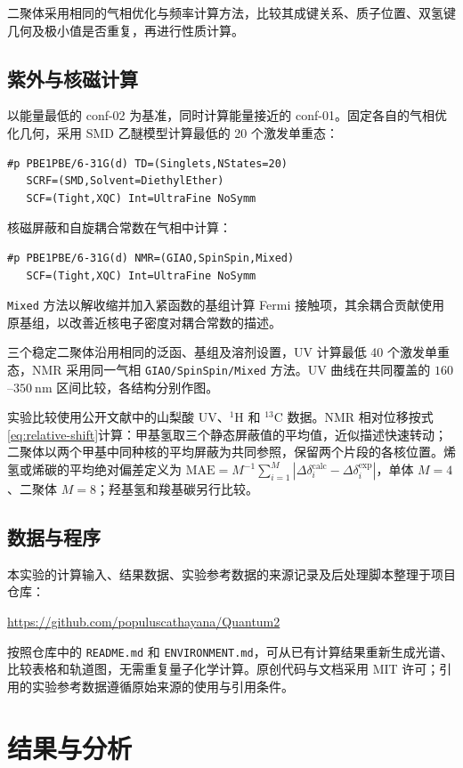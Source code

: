 \documentclass[a4paper,12pt]{article}
\begin{document}
二聚体采用相同的气相优化与频率计算方法，比较其成键关系、质子位置、双氢键几何及极小值是否重复，再进行性质计算。

\subsection{紫外与核磁计算}
以能量最低的 conf-02 为基准，同时计算能量接近的 conf-01。固定各自的气相优化几何，采用 SMD 乙醚模型计算最低的 20 个激发单重态：
\begin{lstlisting}
#p PBE1PBE/6-31G(d) TD=(Singlets,NStates=20)
   SCRF=(SMD,Solvent=DiethylEther)
   SCF=(Tight,XQC) Int=UltraFine NoSymm
\end{lstlisting}
核磁屏蔽和自旋耦合常数在气相中计算：
\begin{lstlisting}
#p PBE1PBE/6-31G(d) NMR=(GIAO,SpinSpin,Mixed)
   SCF=(Tight,XQC) Int=UltraFine NoSymm
\end{lstlisting}
\texttt{Mixed} 方法以解收缩并加入紧函数的基组计算 Fermi 接触项，其余耦合贡献使用原基组，以改善近核电子密度对耦合常数的描述\cite{nmr,deng}。

三个稳定二聚体沿用相同的泛函、基组及溶剂设置，UV 计算最低 40 个激发单重态，NMR 采用同一气相 \texttt{GIAO/SpinSpin/Mixed} 方法。UV 曲线在共同覆盖的 $160$--$350\ \mathrm{nm}$ 区间比较，各结构分别作图。

实验比较使用公开文献中的山梨酸 UV、$^1$H 和 $^{13}$C 数据。NMR 相对位移按式\eqref{eq:relative-shift}计算：甲基氢取三个静态屏蔽值的平均值，近似描述快速转动；二聚体以两个甲基中同种核的平均屏蔽为共同参照，保留两个片段的各核位置。烯氢或烯碳的平均绝对偏差定义为 $\mathrm{MAE}=M^{-1}\sum_{i=1}^{M}|\Delta\delta_i^{\mathrm{calc}}-\Delta\delta_i^{\mathrm{exp}}|$，单体 $M=4$、二聚体 $M=8$；羟基氢和羧基碳另行比较。

\subsection{数据与程序}
本实验的计算输入、结果数据、实验参考数据的来源记录及后处理脚本整理于项目仓库：
\begin{center}
\url{https://github.com/populuscathayana/Quantum2}
\end{center}
按照仓库中的 \texttt{README.md} 和 \texttt{ENVIRONMENT.md}，可从已有计算结果重新生成光谱、比较表格和轨道图，无需重复量子化学计算。原创代码与文档采用 MIT 许可；引用的实验参考数据遵循原始来源的使用与引用条件。

\clearpage
\section{结果与分析}
\end{document}
